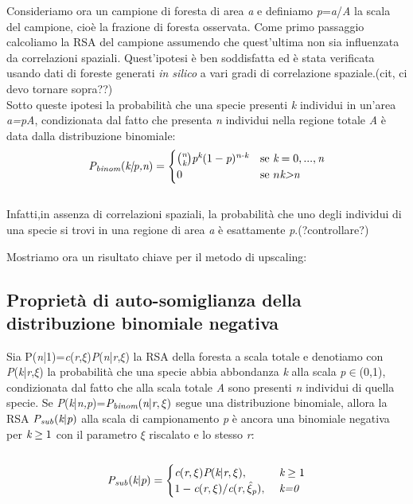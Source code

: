 Consideriamo ora un campione di foresta di area \emph{a} e definiamo \emph{p}=\emph{a}/\emph{A} la scala del campione, cioè la frazione di foresta osservata.
Come primo passaggio calcoliamo la RSA del campione assumendo che quest'ultima non sia influenzata da correlazioni spaziali. Quest'ipotesi è ben soddisfatta ed è stata verificata usando dati di foreste generati \emph{in silico} a vari gradi di correlazione spaziale.(cit, ci devo tornare sopra??)\\
Sotto queste ipotesi la probabilità che una specie presenti \emph{k} individui in un'area \emph{a=pA}, condizionata dal fatto che presenta \emph{n} individui nella regione totale \emph{A} è data dalla distribuzione binomiale:
\\ 
\begin{equation}
\emph{P}_\emph{binom}(\emph{k|p,n})=\begin{cases} \binom{\emph{n}}{\emph{k}}\emph{p}^\emph{k}(1-\emph{p})^{\emph{n-k}} & \mbox{se }\emph{k}=0,...,\emph{n} \\ 0 & \mbox{se }n\mbox{\emph{k>n}}
\end{cases}
\end{equation}
\\ 

Infatti,in assenza di correlazioni spaziali, la probabilità che uno degli individui di una specie si trovi in una regione di area \emph{a} è esattamente \emph{p}.(?controllare?)

Mostriamo ora un risultato chiave per il metodo di upscaling:
\subsection{Proprietà di auto-somiglianza della distribuzione binomiale negativa}
Sia P(\emph{n}|1)=\emph{c}(\emph{r},$\xi$)\emph{P}(\emph{n}|\emph{r},$\xi$) la RSA della foresta a scala totale e denotiamo con \emph{P}(\emph{k}|\emph{r},$\xi$) la probabilità che una specie abbia abbondanza \emph{k} alla scala \emph{p}$\in$(0,1), condizionata dal fatto che alla scala totale \emph{A} sono presenti \emph{n} individui di quella specie.
Se \emph{P}(\emph{k}|\emph{n,p})=$\emph{P}_\emph{binom}(\emph{n}|\emph{r},\xi)$ segue una distribuzione binomiale, allora la RSA $\emph{P}_\emph{sub}(\emph{k}|\emph{p})$ alla scala di campionamento \emph{p} è ancora una binomiale negativa per $\emph{k}\ge1$ con il parametro $\xi$ riscalato e lo stesso \emph{r}:
\\ \\
\begin{equation}
    \emph{P}_\emph{sub}(\emph{k}|\emph{p})=\begin{cases} \emph{c}(\emph{r},\xi)\emph{P}(\emph{k}|\emph{r},\xi), & \mbox{ }\emph{k}\ge1 \\ 1-\emph{c}(\emph{r},\xi)/\emph{c}(\emph{r},\hat\xi_{\emph{p}}), & \mbox{ }\mbox{\emph{k=0}}
    \end{cases}
\label{eq:RSAbinom}
\end{equation}

